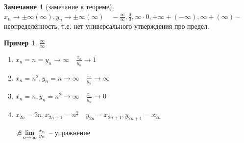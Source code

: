 \documentclass{book}
\theoremstyle{definition}
\newtheorem*{note}{Замечание}
\newtheorem*{example}{Пример}
\begin{document}
\begin{note}
    [замечание к теореме]

    $x_{n} \to \pm \infty (\infty ), y_{n} \to \pm \infty (\infty )\quad -\frac{\infty }{\infty }, \frac{0}{0}, \infty \cdot 0, +\infty +(-\infty ), \infty +(\infty )$ -- неопределённость, т.е. нет универсального утверждения про предел.
\end{note}
\begin{example}
    $\frac{\infty }{\infty }$

    \begin{enumerate}
        \item $x_{n} =n=y_{n} \to \infty  \quad \frac{x_{n} }{y_{n} } \to 1$
        \item $x_{n} =n^2, y_{n} =n \to \infty\quad \frac{x_{n} }{y_{n} } \to \infty  $
        \item $x_{n} =n, y_{n} =n^2 \to \infty \quad \frac{x_{n} }{y_{n} } \to  0$
        \item $x_{2n}=2n, x_{2n+1} = n^2\quad y_{2n} = x_{2n+1}, y_{2n+1} = x_{2n}$

            $\not \exists \lim_{n \to \infty} \frac{x_{n} }{y_{n} } $ -- упражнение
    \end{enumerate}
\end{example}
\end{document}
